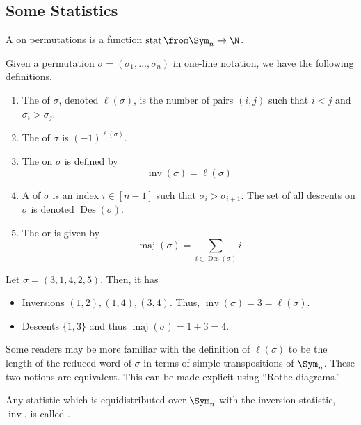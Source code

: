 \documentclass[11pt,leqno,oneside]{amsart}
\numberwithin{thm}{section}
\newcommand{\inv}{\operatorname{inv}}
\newcommand{\stat}{\operatorname{stat}}
\newcommand{\Des}{\operatorname{Des}}
\newcommand{\maj}{\operatorname{maj}}
\begin{document}
\subsection{Some Statistics}
\begin{defn}
  A  on permutations is a function \(\stat \from \Sym_n
  \to \N\). 
\end{defn}
\begin{defn}
  Given a permutation \(\sigma = (\sigma_1,
  \ldots, \sigma_n)\) in one-line notation, we have the following
  definitions. 
  \begin{enumerate}
  \item The  of \(\sigma\), denoted \(\ell(\sigma)\), is
    the number of pairs \((i,j)\) such that \(i < j\) and \(\sigma_i >
    \sigma_j\).
  \item The  of \(\sigma\) is \((-1)^{\ell(\sigma)}\).
  \item The  on \(\sigma\) is defined by \[
      \inv(\sigma) = \ell(\sigma)
    \]
  \item A  of \(\sigma\) is an index \(i \in [n-1]\) such
    that \(\sigma_i > \sigma_{i+1}\). The set of all descents on
    \(\sigma\) is denoted \(\Des(\sigma)\).
  \item The  or  is given by \[
      \maj(\sigma) = \sum_{i \in \Des(\sigma)} i
    \]
  \end{enumerate}
\end{defn}
\begin{example}
  Let \(\sigma = (3,1,4,2,5)\). Then, it has
  \begin{itemize}
  \item Inversions \((1,2), (1,4), (3,4)\). Thus, \(\inv(\sigma) = 3 =
    \ell(\sigma)\).
  \item Descents \(\{1,3\}\) and thus \(\maj(\sigma) = 1+3 = 4\).
  \end{itemize}
\end{example}
\begin{rmk}
  Some readers may be more familiar with the definition of
  \(\ell(\sigma)\) to be the length of the reduced word of \(\sigma\)
  in terms of 
  simple transpositions of \(\Sym_n\). These two notions are
  equivalent. This can be made explicit using ``Rothe diagrams.''
\end{rmk}
\begin{defn}
  Any statistic which is equidistributed over \(\Sym_n\) with the
  inversion statistic, \(\inv\), is called .
\end{defn}
\end{document}
